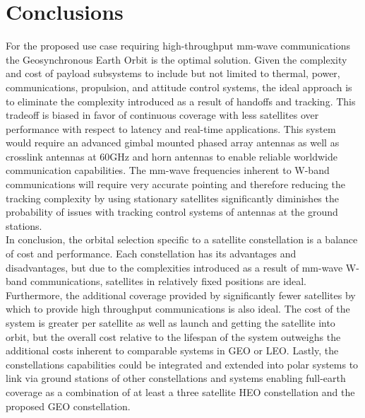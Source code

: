 \documentclass[conference]{IEEEtran}
\begin{document}
\section{Conclusions}
For the proposed use case requiring high-throughput mm-wave communications the Geosynchronous Earth Orbit is the optimal solution. Given the complexity and cost of payload subsystems to include but not limited to thermal, power, communications, propulsion, and attitude control systems, the ideal approach is to eliminate the complexity introduced as a result of handoffs and tracking. This tradeoff is biased in favor of continuous coverage with less satellites over performance with respect to latency and real-time applications. This system would require an advanced gimbal mounted phased array antennas as well as crosslink antennas at 60GHz and horn antennas to enable reliable worldwide communication capabilities. The mm-wave frequencies inherent to W-band communications will require very accurate pointing and therefore reducing the tracking complexity by using stationary satellites significantly diminishes the probability of issues with tracking control systems of antennas at the ground stations. 
\\In conclusion, the orbital selection specific to a satellite constellation is a balance of cost and performance. Each constellation has its advantages and disadvantages, but due to the complexities introduced as a result of mm-wave W-band communications, satellites in relatively fixed positions are ideal. Furthermore, the additional coverage provided by significantly fewer satellites by which to provide high throughput communications is also ideal. The cost of the system is greater per satellite as well as launch and getting the satellite into orbit, but the overall cost relative to the lifespan of the system outweighs the additional costs inherent to comparable systems in GEO or LEO. Lastly, the constellations capabilities could be integrated and extended into polar systems to link via ground stations of other constellations and systems enabling full-earth coverage as a combination of at least a three satellite HEO constellation and the proposed GEO constellation. 
\end{document}
